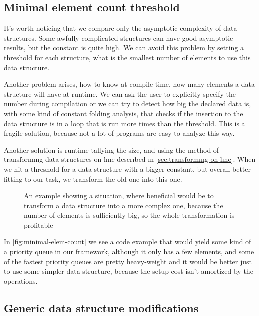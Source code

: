 \documentclass[a4paper,11pt]{article}
\begin{document}
	\subsection{Minimal element count threshold}

		It's worth noticing that we compare only the asymptotic complexity of data structures. Some awfully
		complicated structures can have good asymptotic results, but the constant is quite high. We can avoid
		this problem by setting a threshold for each structure, what is the smallest number of elements to use
		this data structure.

		Another problem arises, how to know at compile time, how many elements a data structure will have at
		runtime. We can ask the user to explicitly specify the number during compilation or we can try to
		detect how big the declared data is, with some kind of constant folding analysis, that checks if the
		insertion to the data structure is in a loop that is run more times than the threshold. This is a fragile
		solution, because not a lot of programs are easy to analyze this way.

		Another solution is runtime tallying the size, and using the method of transforming data structures
		on-line described in \autoref{sec:transforming-on-line}. When we hit a threshold for a data structure
		with a bigger constant, but overall better fitting to our task, we transform the old one into this one.

		\begin{figure}
			

			\caption{An example showing a situation, where beneficial would be to transform a data structure
				into a more complex one, because the number of elements is sufficiently big, so the
				whole transformation is profitable}

			\label{fig:minimal-elem-count}
		\end{figure}

        In \autoref{fig:minimal-elem-count} we see a code example that would yield some kind of a priority queue in our
        framework, although it only has a few elements, and some of the fastest priority queues are pretty heavy-weight
        and it would be better just to use some simpler data structure, because the setup cost isn't amortized by the
        operations.

	\subsection{Generic data structure modifications} \label{sub:gdsm}
\end{document}
